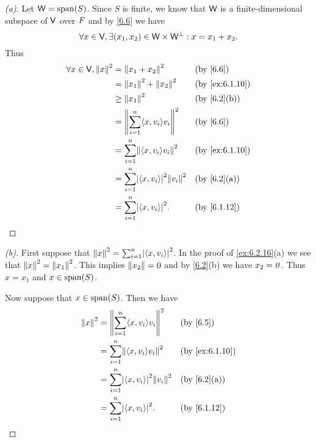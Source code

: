 \begin{proof}[(a)]
  Let \(\W = \spn{S}\).
  Since \(S\) is finite, we know that \(\mathsf{W}\) is a finite-dimensional subspace of \(\mathsf{V}\) over \(\mathit{F}\) and by \cref{6.6} we have
  \[
    \forall x \in \mathsf{V}, \exists (x_1, x_2) \in \mathsf{W} \times \mathsf{W}^{\perp} : x = x_1 + x_2.
  \]
  Thus
  \begin{align*}
    \forall x \in \V, \norm{x}^2 & = \norm{x_1 + x_2}^2                               &  & \text{(by \cref{6.6})}       \\
                                 & = \norm{x_1}^2 + \norm{x_2}^2                      &  & \text{(by \cref{ex:6.1.10})} \\
                                 & \geq \norm{x_1}^2                                  &  & \text{(by \cref{6.2}(b))}    \\
                                 & = \norm{\sum_{i = 1}^n \inn{x, v_i} v_i}^2         &  & \text{(by \cref{6.6})}       \\
                                 & = \sum_{i = 1}^n \norm{\inn{x, v_i} v_i}^2         &  & \text{(by \cref{ex:6.1.10})} \\
                                 & = \sum_{i = 1}^n \abs{\inn{x, v_i}}^2 \norm{v_i}^2 &  & \text{(by \cref{6.2}(a))}    \\
                                 & = \sum_{i = 1}^n \abs{\inn{x, v_i}}^2.             &  & \text{(by \cref{6.1.12})}
  \end{align*}
\end{proof}

\begin{proof}[(b)]
  First suppose that \(\norm{x}^2 = \sum_{i = 1}^n \abs{\inn{x, v_i}}^2\).
  In the proof of \cref{ex:6.2.16}(a) we see that \(\left\lVert x\right\rVert^2 = \left\lVert x_1\right\rVert^2\).
  This implies \(\left\lVert x_2\right\rVert = 0\) and by \cref{6.2}(b) we have \(x_2 = \mathit{0}\).
  Thus \(x = x_1\) and \(x \in \spn{S}\).

  Now suppose that \(x \in \spn{S}\).
  Then we have
  \begin{align*}
    \norm{x}^2 & = \norm{\sum_{i = 1}^n \inn{x, v_i} v_i}^2         &  & \text{(by \cref{6.5})}       \\
               & = \sum_{i = 1}^n \norm{\inn{x, v_i} v_i}^2         &  & \text{(by \cref{ex:6.1.10})} \\
               & = \sum_{i = 1}^n \abs{\inn{x, v_i}}^2 \norm{v_i}^2 &  & \text{(by \cref{6.2}(a))}    \\
               & = \sum_{i = 1}^n \abs{\inn{x, v_i}}^2.             &  & \text{(by \cref{6.1.12})}
  \end{align*}
\end{proof}
